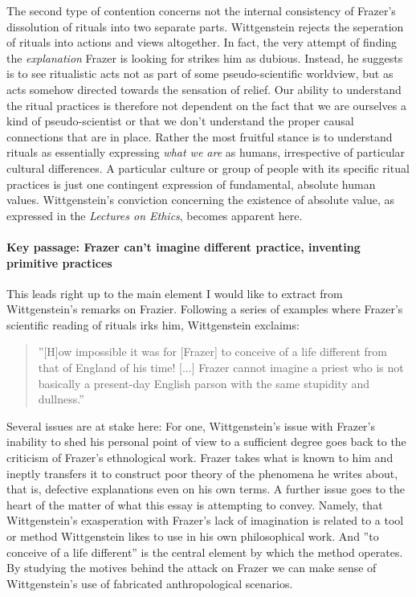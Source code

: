 \documentclass{article}
\begin{document}
The second type of contention concerns not the internal consistency of Frazer's dissolution of rituals into two separate parts. Wittgenstein rejects the seperation of rituals into actions and views altogether.
In fact, the very attempt of finding the \textit{explanation} Frazer is looking for strikes him as dubious.
Instead, he suggests is to see ritualistic acts not as part of some pseudo-scientific worldview, but as acts somehow directed towards the sensation of relief. Our ability to understand the ritual practices is therefore not dependent on the fact that we are ourselves a kind of pseudo-scientist or that we don't understand the proper causal connections that are in place. Rather the most fruitful stance is to understand rituals as essentially expressing \textit{what we are} as humans, irrespective of particular cultural differences. A particular culture or group of people with its specific ritual practices is just one contingent expression of fundamental, absolute human values. Wittgenstein's conviction concerning the existence of absolute value, as expressed in the \textit{Lectures on Ethics}, becomes apparent here.

\paragraph{Key passage: Frazer can't imagine different practice, inventing primitive practices}
This leads right up to the main element I would like to extract from Wittgenstein's remarks on Frazier. Following a series of examples where Frazer's scientific reading of rituals irks him, Wittgenstein exclaims:
\begin{quote}
''[H]ow impossible it was for [Frazer] to conceive of a life different from that of England of his time! [...] Frazer cannot imagine a priest who is not basically a present-day English parson with the same stupidity and dullness.''
\end{quote}
Several issues are at stake here: For one, Wittgenstein's issue with Frazer's inability to shed his personal point of view to a sufficient degree goes back to the criticism of Frazer's ethnological work. Frazer takes what is known to him and ineptly transfers it to construct poor theory of the phenomena he writes about, that is, defective explanations even on his own terms. A further issue goes to the heart of the matter of what this essay is attempting to convey. Namely, that Wittgenstein's exasperation with Frazer's lack of imagination is related to a tool or method Wittgenstein likes to use in his own philosophical work. And ''to conceive of a life different'' is the central element by which the method operates. By studying the motives behind the attack on Frazer we can make sense of Wittgenstein's use of fabricated anthropological scenarios. 
 
\end{document}

